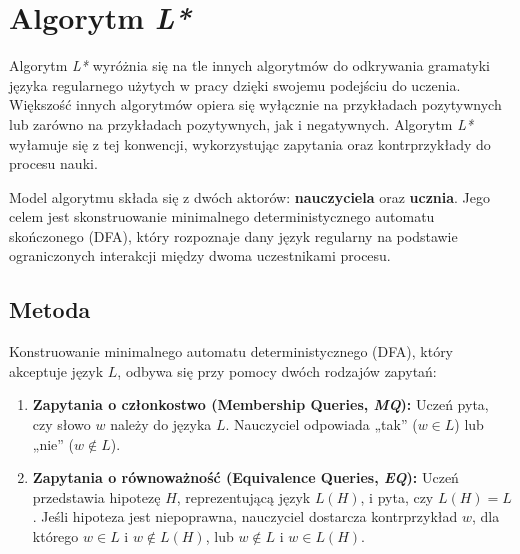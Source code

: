 \newenvironment{observationtable}[1][Tabela Obserwacji]{
  \begin{center}
  \renewcommand{\arraystretch}{1.3}
  \textbf{#1}\vspace{0.5em} \\
  \begin{tabular}{|c|c|c|}
  \hline
}{
  \hline
  \end{tabular}
  \end{center}
}

\section{Algorytm \textit{L*}}
\label{sec:l-star}

Algorytm \textit{L*} \cite{L_STAR} wyróżnia się na tle innych algorytmów do odkrywania gramatyki języka regularnego użytych w pracy dzięki swojemu podejściu do uczenia. Większość innych algorytmów opiera się wyłącznie na przykładach pozytywnych lub zarówno na przykładach pozytywnych, jak i negatywnych. Algorytm \textit{L*} wyłamuje się z tej konwencji, wykorzystując zapytania oraz kontrprzykłady do procesu nauki.

Model algorytmu składa się z dwóch aktorów: \textbf{nauczyciela} oraz \textbf{ucznia}. Jego celem jest skonstruowanie minimalnego deterministycznego automatu skończonego (DFA), który rozpoznaje dany język regularny na podstawie ograniczonych interakcji między dwoma uczestnikami procesu.

\subsection{Metoda}

Konstruowanie minimalnego automatu deterministycznego (DFA), który akceptuje język \( L \), odbywa się przy pomocy dwóch rodzajów zapytań:
\begin{enumerate}
    \item \textbf{Zapytania o członkostwo (Membership Queries, \textit{MQ}):} Uczeń pyta, czy słowo \( w \) należy do języka \( L \). Nauczyciel odpowiada „tak” (\( w \in L \)) lub „nie” (\( w \notin L \)).
    \item \textbf{Zapytania o równoważność (Equivalence Queries, \textit{EQ}):} Uczeń przedstawia hipotezę \( H \), reprezentującą język \( L(H) \), i pyta, czy \( L(H) = L \). Jeśli hipoteza jest niepoprawna, nauczyciel dostarcza kontrprzykład \( w \), dla którego \( w \in L \) i \( w \notin L(H) \), lub \( w \notin L \) i \( w \in L(H) \).
\end{enumerate}

